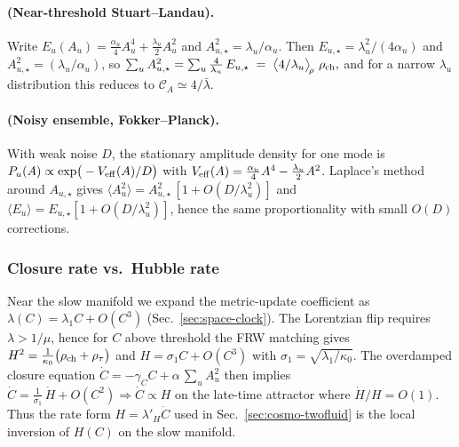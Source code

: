 \documentclass[11pt]{article}
\begin{document}
\paragraph{(Near-threshold Stuart--Landau).}
Write $E_u(A_u)=\tfrac{\alpha_u}{4}A_u^4+\tfrac{\lambda_u}{2}A_u^2$ and $A_{u,\star}^2=\lambda_u/\alpha_u$.
Then $E_{u,\star}=\lambda_u^2/(4\alpha_u)$ and $A_{u,\star}^2=(\lambda_u/\alpha_u)$, so
\(
\sum_u A_{u,\star}^2 = \sum_u \frac{4}{\lambda_u}\,E_{u,\star} \;=\; \big\langle 4/\lambda_u\big\rangle_{\!\rho}\ \rho_{\rm ch},
\)
and for a narrow $\lambda_u$ distribution this reduces to $\mathcal C_A\simeq 4/\bar\lambda$.

\paragraph{(Noisy ensemble, Fokker--Planck).}
With weak noise $D$, the stationary amplitude density for one mode is
$P_u(A)\propto \exp\!\big(-V_{\rm eff}(A)/D\big)$ with $V_{\rm eff}(A)=\tfrac{\alpha_u}{4}A^4-\tfrac{\lambda_u}{2}A^2$.
Laplace’s method around $A_{u,\star}$ gives
$\langle A_u^2\rangle = A_{u,\star}^2\,[1+O(D/\lambda_u^2)]$ and $\langle E_u\rangle = E_{u,\star}[1+O(D/\lambda_u^2)]$,
hence the same proportionality with small $O(D)$ corrections.

\subsubsection{Closure rate vs.\ Hubble rate}\label{subsub:closure-rate}
Near the slow manifold we expand the metric-update coefficient as $\lambda(C)=\lambda_1 C + O(C^3)$ (Sec.~\ref{sec:space-clock}).
The Lorentzian flip requires $\lambda>1/\mu$, hence for $C$ above threshold the FRW matching gives
$H^2=\frac{1}{\kappa_0}\big(\rho_{\rm ch}+\rho_\tau\big)$ and $H= \sigma_1 C + O(C^3)$ with $\sigma_1=\sqrt{\lambda_1/\kappa_0}$.
The overdamped closure equation $\dot C=-\gamma_C C+\alpha\,\sum_u A_u^2$ then implies
\(
\dot C = \frac{1}{\sigma_1}\,\dot H + O(C^2)\Rightarrow \dot C \propto H
\)
on the late-time attractor where $\dot H/H=O(1)$.
Thus the rate form $H=\lambda'_H \dot C$ used in Sec.~\ref{sec:cosmo-twofluid} is the local inversion of $H(C)$ on the slow manifold.
\end{document}
